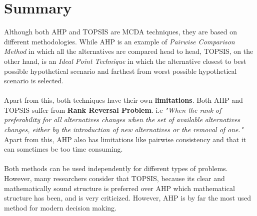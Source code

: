 \documentclass[10pt, a4paper]{article}
\begin{document}
\section*{Summary}
\noindent Although both AHP and TOPSIS are MCDA techniques, they are based on different methodologies. While AHP is an example of \emph{Pairwise Comparison Method} in which all the alternatives are compared head to head, TOPSIS, on the other hand, is an \emph{Ideal Point Technique} in which the alternative closest to best possible hypothetical scenario and farthest from worst possible hypothetical scenario is selected.\\~\\
Apart from this, both techniques have their own \textbf{limitations}. Both AHP and TOPSIS suffer from \textbf{Rank Reversal Problem}. i.e \textsl{"When the rank of preferability for all alternatives changes when the set of available alternatives changes, either by the introduction of new alternatives or the removal of one."} \\
Apart from this, AHP also has limitations like pairwise consistency and that it can sometimes be too time consuming.\\~\\
Both methods can be used independently for different types of problems. However, many researchers consider that TOPSIS, because its clear and mathematically sound structure is preferred over AHP which mathematical structure has been, and is very criticized. However, AHP is by far the most used method for modern decision making.
\end{document}

